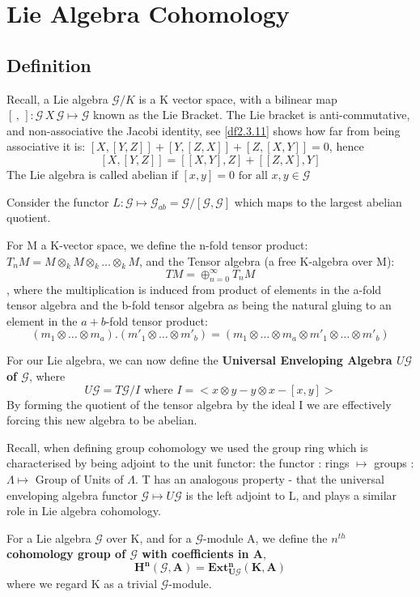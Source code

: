 \section{Lie Algebra Cohomology}\label{df4}

\subsection{Definition}
Recall, a Lie algebra $\mathcal G/K$ is a K vector space, with a
bilinear map $[\, ,\, ]:\mathcal G \, X\, \mathcal G \mapsto
\mathcal G$ known as the Lie Bracket. The Lie bracket is
anti-commutative, and non-associative the Jacobi identity, see
\ref{df2.3.11} shows how far from being associative it is:
$[X,[Y,Z]]+[Y,[Z,X]]+[Z,[X,Y]] = 0$, hence
$$[X,[Y,Z]]=[[X,Y],Z]+[[Z,X],Y]$$
The Lie algebra is called abelian if $[x,y]=0 \text{ for all } x,y
\in \mathcal G$

Consider the functor $L:\mathcal G\mapsto \mathcal G_{ab} =
\mathcal G /{[\mathcal G, \mathcal G]}$ which maps to the largest
abelian quotient.


For M a K-vector space, we define the n-fold tensor product: $T_nM
= M\otimes_k M\otimes_k \dots \otimes_k M$, and the Tensor algebra
(a free K-algebra over M):$$TM = \oplus_{n=0}^\infty T_nM$$, where
the multiplication is induced from product of elements in the
a-fold tensor algebra and the b-fold tensor algebra as being the
natural gluing to an element in the $a+b$-fold tensor product:
$$(m_1\otimes\dots\otimes m_a).(m'_1\otimes\dots\otimes m'_b) =
(m_1\otimes\dots\otimes m_a\otimes m'_1\otimes\dots\otimes m'_b)$$

For our Lie algebra, we can now define the \textbf{Universal
Enveloping Algebra $U\mathcal G$ of $\mathcal G$}, where
$$U\mathcal G = {T\mathcal G}/I \text{ where } I=<x\otimes y -
y\otimes x -[x,y]>$$ By forming the quotient of the tensor algebra
by the ideal I we are effectively forcing this new algebra to be
abelian.

Recall, when defining group cohomology we used the group ring
which is characterised by being adjoint to the unit functor: the
functor : rings $\mapsto$ groups : $\Lambda \mapsto$ Group of
Units of $\Lambda$. T has an analogous property - that the
universal enveloping algebra functor $\mathcal G \mapsto U
\mathcal G$ is the left adjoint to L, and plays a similar role in
Lie algebra cohomology.

For a Lie algebra $\mathcal G$ over K, and for a $\mathcal
G$-module A, we define the \textbf{$n^{th}$ cohomology group of
$\mathcal G$ with coefficients in A},
$$\mathbf{H^n(\mathcal G, A) = Ext^n_{U\mathcal G} (K,A)}$$
where we regard K as a trivial $\mathcal G$-module.

